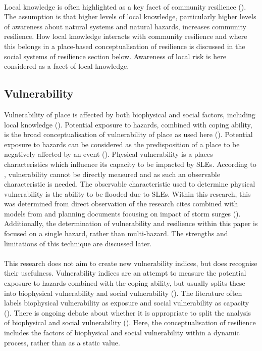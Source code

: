 \paragraph{}

Local knowledge is often highlighted as a key facet of community resilience (\cite{setten_we_2019}). The assumption is that higher levels of local knowledge, particularly higher levels of awareness about natural systems and natural hazards, increases community resilience.  How local knowledge interacts with community resilience and where this belongs in a place-based conceptualisation of resilience is discussed in the social systems of resilience section below. Awareness of local risk is here considered as a facet of local knowledge.  


 
\subsection{Vulnerability}
Vulnerability of place is affected by both biophysical and social factors, including local knowledge (\cite{opach_seeking_2020}). Potential exposure to hazards, combined with coping ability, is the broad conceptualisation of vulnerability of place as used here (\cite{rygel_method_2006}). Potential exposure to hazards can be considered as the predisposition of a place to be negatively affected by an event (\cite{lujala_quantifying_2014}).  Physical vulnerability is a places characteristics which influence its capacity to be impacted by SLEs. According to \cite{rod_integrated_2012}, vulnerability cannot be directly measured and as such an observable characteristic is needed.  The observable characteristic used to determine physical vulnerability is the ability to be flooded due to SLEs. Within this research, this was determined from direct observation of the research cites combined with models from \cite{kartverket_se_2020} and planning documents focusing on impact of storm surges (\cite{miljoenheten_og_byplankontoret_trondheim_kommune_9-notat-om-havnivastigning-og-stormflo---hensyn-i-arealplanlegging-nyhavnapdf_2020}). Additionally, the determination of vulnerability and resilience within this paper is focused on a single hazard, rather than multi-hazard. The strengths and limitations of this technique are discussed later. 
\paragraph{}
This research does not aim to create new vulnerability indices, but does recognise their usefulness. Vulnerability indices are an attempt to measure the potential exposure to hazards combined with the coping ability, but usually splits these into biophysical vulnerability  and social vulnerability (\cite{rod_integrated_2012}). The literature often labels biophysical vulnerability as exposure and social vulnerability as capacity (\cite{rod_integrated_2012}). There is ongoing debate about whether it is appropriate to split the analysis of biophysical and social vulnerability (\cite{lujala_quantifying_2014}). Here, the conceptualisation of resilience includes the factors of biophysical and social vulnerability within a dynamic process, rather than as a static value.

